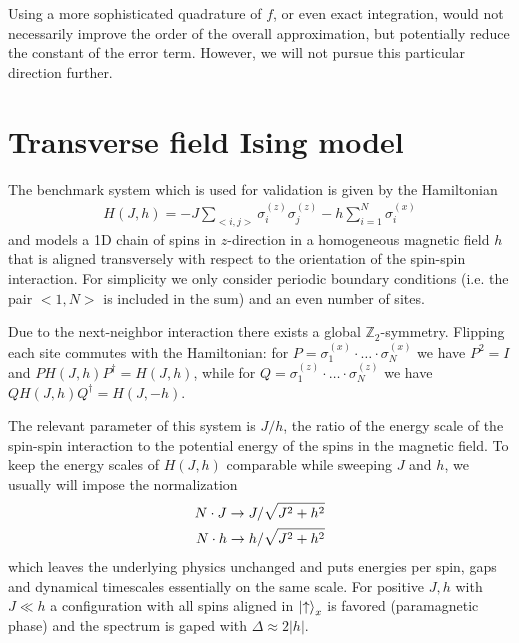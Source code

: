 \documentclass[12pt,a4paper]{article}
\begin{document}
Using a more sophisticated quadrature of $f$, or even exact integration, would not necessarily improve the order of the overall approximation, but potentially reduce the constant of the error term. However, we will not pursue this particular direction further.

\section{Transverse field Ising model}\label{sec:TFIM}
The benchmark system which is used for validation is given by the Hamiltonian
\begin{align}\label{eq:TFIM_Hamiltonian}
    H(J,h) = -J\sum_{<i,j>} \sigma^{(z)}_{i}\sigma^{(z)}_{j} - h\sum_{i=1}^{N} \sigma^{(x)}_i 
\end{align} 
and models a 1D chain of spins in $z$-direction in a homogeneous magnetic field $h$ that is aligned transversely with respect to the orientation of the spin-spin interaction. For simplicity we only consider periodic boundary conditions (i.e. the pair $<1, N>$ is included in the sum) and an even number of sites.

Due to the next-neighbor interaction there exists a global $\mathbb{Z}_2$-symmetry. Flipping each site commutes with the Hamiltonian: for $P=\sigma^{(x)}_{1}\cdot\ldots\cdot \sigma^{(x)}_{N}$ we have $P^2=I$ and $P H(J,h) P^{\dagger}=H(J,h)$, while for $Q=\sigma^{(z)}_{1}\cdot\ldots\cdot \sigma^{(z)}_{N}$ we have $Q H(J,h) Q^{\dagger}=H(J,-h)$.

The relevant parameter of this system is $J/h$, the ratio of the energy scale of the spin-spin interaction to the potential energy of the spins in the magnetic field. To keep the energy scales of $H(J,h)$ comparable while sweeping $J$ and $h$, we usually will impose the normalization
\begin{align}\label{eq:JHnormalization}
   N\cdot J \to J/\sqrt{J^2+h^2}\notag \\
   N\cdot h \to h/\sqrt{J^2+h^2}
\end{align} which leaves the underlying physics unchanged and puts energies per spin, gaps and dynamical timescales essentially on the same scale.  For positive $J,h$ with $J\ll h$ a configuration with all spins aligned in $\ket{\uparrow}_x$ is favored (paramagnetic phase) and the spectrum is gaped with $\Delta \approx 2|h|$. 
\end{document}
